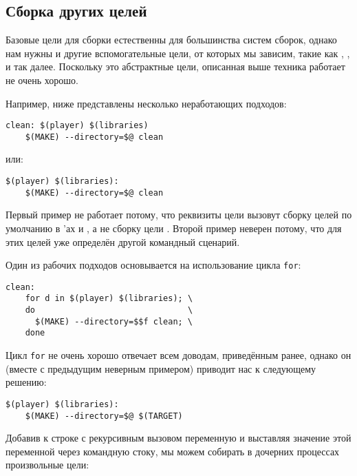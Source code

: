 \subsection{Сборка других целей}

Базовые цели для сборки естественны для большинства систем сборок,
однако нам нужны и другие вспомогательные цели, от которых мы зависим,
такие как , ,  и так
далее. Поскольку это абстрактные цели, описанная выше техника работает
не очень хорошо.

Например, ниже представлены несколько неработающих подходов:

{\footnotesize
\begin{verbatim}
clean: $(player) $(libraries)
    $(MAKE) --directory=$@ clean
\end{verbatim}
}
или:
{\footnotesize
\begin{verbatim}
$(player) $(libraries):
    $(MAKE) --directory=$@ clean
\end{verbatim}
}

Первый пример не работает потому, что реквизиты цели 
вызовут сборку целей по умолчанию в \Makefile{}'ах
 и , а не сборку цели
. Второй пример неверен потому, что для этих целей уже
определён другой командный сценарий.

Один из рабочих подходов основывается на использование цикла
\texttt{for}:

{\footnotesize
\begin{verbatim}
clean:
    for d in $(player) $(libraries); \
    do                               \
      $(MAKE) --directory=$$f clean; \
    done
\end{verbatim}
}

Цикл \texttt{for} не очень хорошо отвечает всем доводам, приведённым
ранее, однако он (вместе с предыдущим неверным примером) приводит нас
к следующему решению:

{\footnotesize
\begin{verbatim}
$(player) $(libraries):
    $(MAKE) --directory=$@ $(TARGET)
\end{verbatim}
}

Добавив к строке с рекурсивным вызовом \GNUmake{} переменную
 и выставляя значение этой переменной через командную
стоку, мы можем собирать в дочерних процессах \GNUmake{} произвольные
цели:

